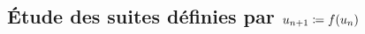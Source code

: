 \documentclass{magnolia}
\begin{document}
\subsection{Étude des suites définies par $u_{n+1}\coloneqq f(u_n)$}


\end{document}
